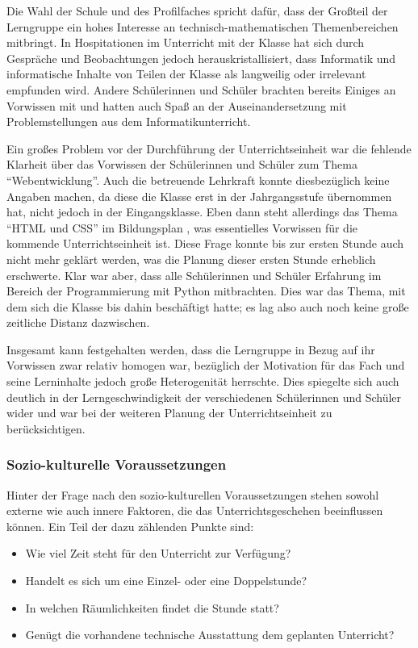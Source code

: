 Die Wahl der Schule und des Profilfaches spricht dafür, dass der Großteil der Lerngruppe ein hohes Interesse an technisch-mathematischen Themenbereichen mitbringt.
In Hospitationen im Unterricht mit der Klasse hat sich durch Gespräche und Beobachtungen jedoch herauskristallisiert, dass Informatik und informatische Inhalte von Teilen der Klasse als langweilig oder irrelevant empfunden wird.
Andere Schülerinnen und Schüler brachten bereits Einiges an Vorwissen mit und hatten auch Spaß an der Auseinandersetzung mit Problemstellungen aus dem Informatikunterricht.

Ein großes Problem vor der Durchführung der Unterrichtseinheit war die fehlende Klarheit über das Vorwissen der Schülerinnen und Schüler zum Thema ``Webentwicklung''.
Auch die betreuende Lehrkraft konnte diesbezüglich keine Angaben machen, da diese die Klasse erst in der Jahrgangsstufe übernommen hat, nicht jedoch in der Eingangsklasse.
Eben dann steht allerdings das Thema ``HTML und CSS'' im Bildungsplan \cite[BPE~2]{bildungsplan-tg-informatik}, was essentielles Vorwissen für die kommende Unterrichtseinheit ist.
Diese Frage konnte bis zur ersten Stunde auch nicht mehr geklärt werden, was die Planung dieser ersten Stunde erheblich erschwerte.
Klar war aber, dass alle Schülerinnen und Schüler Erfahrung im Bereich der Programmierung mit Python mitbrachten.
Dies war das Thema, mit dem sich die Klasse bis dahin beschäftigt hatte; es lag also auch noch keine große zeitliche Distanz dazwischen.

Insgesamt kann festgehalten werden, dass die Lerngruppe in Bezug auf ihr Vorwissen zwar relativ homogen war, bezüglich der Motivation für das Fach und seine Lerninhalte jedoch große Heterogenität herrschte.
Dies spiegelte sich auch deutlich in der Lerngeschwindigkeit der verschiedenen Schülerinnen und Schüler wider und war bei der weiteren Planung der Unterrichtseinheit zu berücksichtigen.

\subsubsection{Sozio-kulturelle Voraussetzungen}
\label{sec:sozio-kulturelle-voraussetzungen}

Hinter der Frage nach den sozio-kulturellen Voraussetzungen stehen sowohl externe wie auch innere Faktoren, die das Unterrichtsgeschehen beeinflussen können. Ein Teil der dazu zählenden Punkte sind:
\begin{itemize}
	\item Wie viel Zeit steht für den Unterricht zur Verfügung?
	\item Handelt es sich um eine Einzel- oder eine Doppelstunde?
	\item In welchen Räumlichkeiten findet die Stunde statt?
	\item Genügt die vorhandene technische Ausstattung dem geplanten Unterricht?
\end{itemize}
